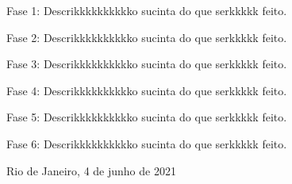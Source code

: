 \documentclass[a4paper,12pt,oneside,openany]{report}
\begin{document}
Fase 1: Descrikkkkkkkkkko sucinta do que serkkkkk feito.

Fase 2: Descrikkkkkkkkkko sucinta do que serkkkkk feito.

Fase 3: Descrikkkkkkkkkko sucinta do que serkkkkk feito.

Fase 4: Descrikkkkkkkkkko sucinta do que serkkkkk feito.

Fase 5: Descrikkkkkkkkkko sucinta do que serkkkkk feito.

Fase 6: Descrikkkkkkkkkko sucinta do que serkkkkk feito.



 


\vspace{2cm}
\noindent
Rio de Janeiro, 4 de junho de 2021

\vspace{0.5cm}
\begin{flushright}
      \parbox{10cm}{
      \hrulefill

      \vspace{-.375cm}

      \vspace{0.9cm}
      \hrulefill

      \vspace{-.375cm}

      \vspace{0.9cm}
      }
\end{flushright}
\vfill
      
\end{document}
